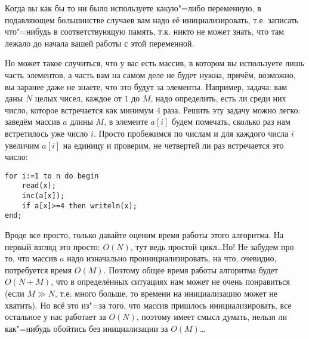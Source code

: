Когда вы как бы то ни было используете какую"=либо переменную, в подавляющем большинстве случаев 
вам надо её инициализировать, т.е. записать что"=нибудь в соответствующую память, т.к. никто не 
может знать, что там лежало до начала вашей работы с этой переменной.


\pagebreak[2]

Но может такое случиться, что у вас есть массив, в котором вы используете лишь часть элементов, а 
часть вам на самом деле не будет нужна, причём, возможно, вы заранее даже не знаете, что это будут 
за элементы. Например, задача: вам даны $N$ целых чисел, каждое от $1$ до $M$, надо 
определить, есть ли среди них число, которое встречается как минимум 4 раза. Решить эту задачу можно легко: заведём массив $a$ 
длины $M$, в элементе $a[i]$ будем помечать, сколько раз нам встретилось уже число $i$. Просто пробежимся 
по числам и для каждого числа $i$ увеличим $a[i]$ на единицу и проверим, не четвертей ли 
раз встречается это число:
\begin{codesampleo}\begin{verbatim}
for i:=1 to n do begin
    read(x);
    inc(a[x]);
    if a[x]>=4 then writeln(x);
end;
\end{verbatim}\end{codesampleo}

Вроде все просто, только давайте оценим время работы этого алгоритма. На первый взгляд это просто: 
$O(N)$, тут ведь простой цикл\dots Но! Не забудем про то, что массив $a$ надо изначально 
проинициализировать, на что, очевидно, потребуется время $O(M)$. Поэтому общее время работы 
алгоритма будет $O(N+M)$, что в определённых ситуациях нам может не очень понравиться (если $M\gg 
N$, т.е. много больше, то времени на инициализацию может не хватить). Но всё это из"=за 
того, что массив пришлось инициализировать, все остальное у нас работает за $O(N)$, поэтому имеет 
смысл думать, нельзя ли как"=нибудь обойтись без инициализации за $O(M)$\dots

